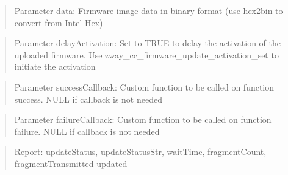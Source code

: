 \begin{quote}Parameter data: Firmware image data in binary format (use hex2bin to convert from Intel Hex)\end{quote}
\begin{quote}Parameter delayActivation: Set to TRUE to delay the activation of the uploaded firmware. Use zway\_cc\_firmware\_update\_activation\_set to initiate the activation\end{quote}
\begin{quote}Parameter successCallback: Custom function to be called on function success. NULL if callback is not needed\end{quote}
\begin{quote}Parameter failureCallback: Custom function to be called on function failure. NULL if callback is not needed\end{quote}
\begin{quote}Report: updateStatus, updateStatusStr, waitTime, fragmentCount, fragmentTransmitted updated\end{quote}

